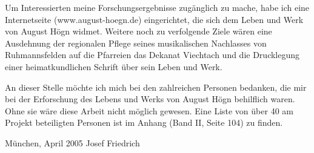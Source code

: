 Um Interessierten meine Forschungsergebnisse zugänglich zu mache, habe
ich eine Internetseite (www.august-hoegn.de) eingerichtet, die sich dem
Leben und Werk von August Högn widmet. Weitere noch zu verfolgende
Ziele wären eine Ausdehnung der regionalen Pflege seines musikalischen
Nachlasses von Ruhmannsfelden auf die Pfarreien das Dekanat Viechtach
und die Drucklegung einer heimatkundlichen Schrift über sein Leben und
Werk.

An dieser Stelle möchte ich mich bei den zahlreichen Personen bedanken,
die mir bei der Erforschung des Lebens und Werks von August Högn
behilflich waren. Ohne sie wäre diese Arbeit nicht möglich gewesen.
Eine Liste von über 40 am Projekt beteiligten Personen ist im Anhang
(Band II, Seite 104) zu finden.

München, April 2005 \hfill Josef Friedrich